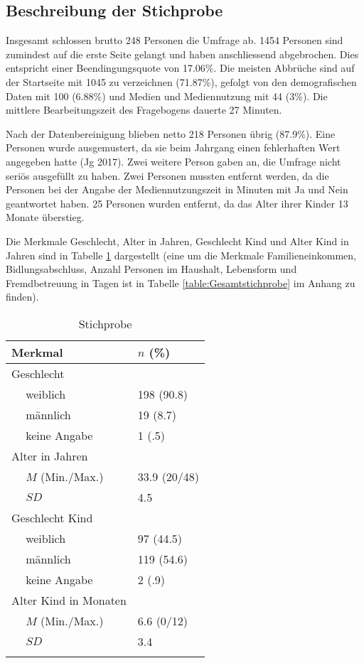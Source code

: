 \subsection{Beschreibung der Stichprobe}
Insgesamt schlossen brutto 248 Personen die Umfrage ab. 1454 Personen sind zumindest auf die erste Seite gelangt und haben anschliessend abgebrochen. Dies entspricht einer Beendingungsquote von 17.06\%. Die meisten Abbrüche sind auf der Startseite mit 1045 zu verzeichnen (71.87\%), gefolgt von den demografischen Daten mit 100 (6.88\%) und Medien und Mediennutzung mit 44 (3\%). Die mittlere Bearbeitungszeit des Fragebogens dauerte 27 Minuten. 

Nach der Datenbereinigung blieben netto 218 Personen übrig (87.9\%). Eine Personen wurde ausgemustert, da sie beim Jahrgang einen fehlerhaften Wert angegeben hatte (Jg 2017). Zwei weitere Person gaben an, die Umfrage nicht seriös ausgefüllt zu haben. Zwei Personen mussten entfernt werden, da die Personen bei der Angabe der Mediennutzungszeit in Minuten mit Ja und Nein geantwortet haben. 25 Personen wurden entfernt, da das Alter ihrer Kinder 13 Monate überstieg. 

Die Merkmale Geschlecht, Alter in Jahren, Geschlecht Kind und Alter Kind in Jahren sind in Tabelle \ref{table:Stichprobe} dargestellt (eine um die Merkmale Familieneinkommen, Bidlungsabschluss, Anzahl Personen im Haushalt, Lebensform und Fremdbetreuung in Tagen ist in Tabelle \ref{table:Gesamtstichprobe} im Anhang zu finden).

\begin{table}[htbp]
\begin{tabular}{m{0.5em}  m{10em}  m{5em}} 
  \hline\hline
  \multicolumn{2}{l}{\textbf{Merkmal}} & \textbf{$n$ (\%)} \\
  \hline
  \multicolumn{2}{l}{Geschlecht} \\ 
   & weiblich & 198 (90.8)\\ 
   & männlich & 19 (8.7)\\ 
   & keine Angabe & 1 (.5)\\ 
   
  \multicolumn{2}{l}{Alter in Jahren} \\
   & $M$ (Min./Max.) & 33.9 (20/48) \\
   & $SD$ & 4.5 \\
  
  \multicolumn{2}{l}{Geschlecht Kind} \\
   & weiblich & 97 (44.5)\\ 
   & männlich & 119 (54.6)\\ 
   & keine Angabe & 2 (.9)\\
  
  \multicolumn{2}{l}{Alter Kind in Monaten} \\
   &  $M$ (Min./Max.) & 6.6 (0/12)\\
   & $SD$ & 3.4\\
  \hline\hline
  &&\\
\end{tabular}
\caption{Stichprobe}
\label{table:Stichprobe}
\end{table}

